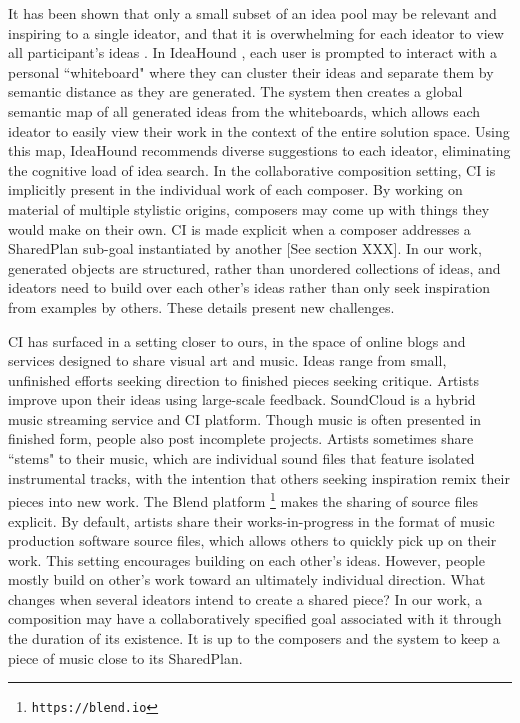 \documentclass[final,authoryear,5p,times,twocolumn]{elsarticle}
\begin{document}
It has been shown that only a small subset of an idea pool may be relevant and inspiring to a single ideator, and that it is overwhelming for each ideator to view all participant's ideas \citep{siangliulue2015toward}. In IdeaHound \citep{siangliulue2016ideahound}, each user is prompted to interact with a personal ``whiteboard" where they can cluster their ideas and separate them by semantic distance as they are generated. The system then creates a global semantic map of all generated ideas from the whiteboards, which allows each ideator to easily view their work in the context of the entire solution space. Using this map, IdeaHound recommends diverse suggestions to each ideator, eliminating the cognitive load of idea search. In the collaborative composition setting, CI is implicitly present in the individual work of each composer. By working on material of multiple stylistic origins, composers may come up with things they would make on their own. CI is made explicit when a composer addresses a SharedPlan sub-goal instantiated by another [See section XXX]. In our work, generated objects are structured, rather than unordered collections of ideas, and ideators need to build over each other's ideas rather than only seek inspiration from examples by others. These details present new challenges.


CI has surfaced in a setting closer to ours, in the space of online blogs and services designed to share visual art and music. Ideas range from small, unfinished efforts seeking direction to finished pieces seeking critique. Artists improve upon their ideas using large-scale feedback. SoundCloud is a hybrid music streaming service and CI platform. Though music is often presented in finished form, people also post incomplete projects. Artists sometimes share ``stems" to their music, which are individual sound files that feature isolated instrumental tracks, with the intention that others seeking inspiration remix their pieces into new work. The Blend platform \footnote{\texttt{https://blend.io}} makes the sharing of source files explicit. By default, artists share their works-in-progress in the format of music production software source files, which allows others to quickly pick up on their work. This setting encourages building on each other's ideas. However, people mostly build on other's work toward an ultimately individual direction. What changes when several ideators intend to create a shared piece? In our work, a composition may have a collaboratively specified goal associated with it through the duration of its existence. It is up to the composers and the system to keep a piece of music close to its SharedPlan.
\end{document}
